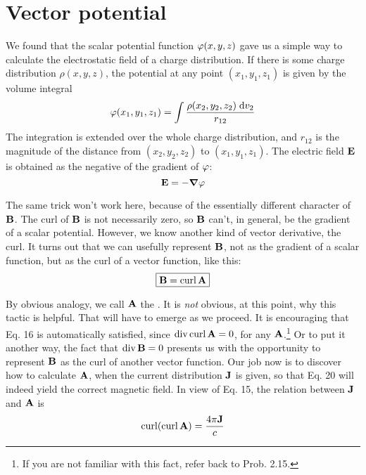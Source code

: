 \section{Vector potential}

We found that the scalar potential function $\varphi(x,y,z)$ gave us a
simple way to calculate the electrostatic field of a charge distribution.
If there is some charge distribution $\rho(x,y,z)$, the potential at any
point $(x_1,y_1,z_1)$ is given by the volume integral
\begin{equation}
  \varphi(x_1,y_1,z_1) = \int \frac{\rho(x_2,y_2,z_2)\;\textup{d} v_2}{r_{12}}
\end{equation}
The integration is extended over the whole charge distribution, and
$r_{12}$ is the magnitude of the distance from $(x_2,y_2,z_2)$ to $(x_1,y_1,z_1)$. The
electric field $\mathbf{E}$ is obtained as the negative of the gradient of $\varphi$:
\begin{equation}
  \mathbf{E} = -\boldsymbol{\nabla} \varphi
\end{equation}

The same trick won't work here, because of the essentially different
character of $\mathbf{B}$. The curl of $\mathbf{B}$ is not necessarily zero, so $\mathbf{B}$ can't, in
general, be the gradient of a scalar potential. However, we know
another kind of vector derivative, the curl. It turns out that we can
usefully represent $\mathbf{B}$, not as the gradient of a scalar function, but as
the curl of a vector function, like this:
\begin{equation}
\boxed{
  \mathbf{B} = \operatorname{curl}\mathbf{A}
}
\end{equation}

By obvious analogy, we call $\mathbf{A}$ the . It is \emph{not}
obvious, at this point, why this tactic is helpful. That will have to
emerge as we proceed. It is encouraging that Eq. 16 is automatically
satisfied, since $\operatorname{div} \operatorname{curl} \mathbf{A} = 0$, for any 
$\mathbf{A}$.\footnote{If you are not familiar with this fact, refer back to Prob. 2.15.}
Or to put it another way,
the fact that $\operatorname{div}\mathbf{B} = 0$ presents us with the opportunity to represent
$\mathbf{B}$ as the curl of another vector function. Our job now is to discover
how to calculate $\mathbf{A}$, when the current distribution $\mathbf{J}$ is given, so that
Eq. 20 will indeed yield the correct magnetic field. In view of Eq. 15,
the relation between $\mathbf{J}$ and $\mathbf{A}$ is
\begin{equation}
  \operatorname{curl}(\operatorname{curl}\mathbf{A}) = \frac{4\pi\mathbf{J}}{c}
\end{equation}

